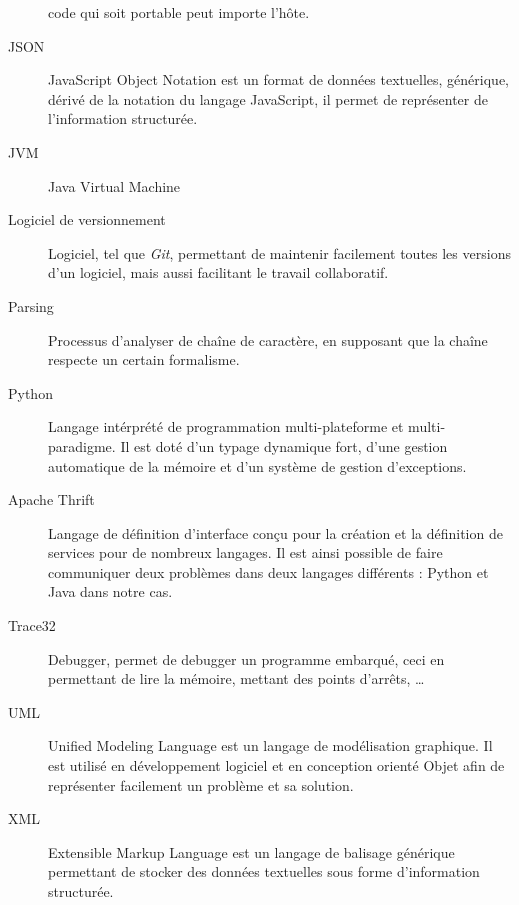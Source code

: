 \begin{description}
	code qui soit portable peut importe l'hôte.
\item[JSON] JavaScript Object Notation est un format de données textuelles, générique, dérivé de la notation du langage JavaScript, il permet de représenter de
	l'information structurée.
\item[JVM] Java Virtual Machine
\item[Logiciel de versionnement] Logiciel, tel que \textit{Git}, permettant de maintenir facilement toutes les versions d'un logiciel, mais aussi facilitant le
	travail collaboratif.
\item[Parsing] Processus d'analyser de chaîne de caractère, en supposant que la chaîne respecte un certain formalisme. 
\item[Python] Langage intérprété de programmation multi-plateforme et multi-paradigme. Il est doté d'un typage dynamique fort, d'une gestion automatique de la mémoire et d'un système de gestion d'exceptions. 
\item[Apache Thrift] Langage de définition d'interface conçu pour la création et la définition de services pour de nombreux langages. Il est ainsi possible de
	faire communiquer deux problèmes dans deux langages différents : Python et Java dans notre cas.
\item[Trace32] Debugger, permet de debugger un programme embarqué, ceci en permettant de lire la mémoire, mettant des points d'arrêts, \ldots
\item[UML] Unified Modeling Language est un langage de modélisation graphique. Il est utilisé en développement logiciel et en conception orienté Objet afin de
	représenter facilement un problème et sa solution.
\item[XML] Extensible Markup Language est un langage de balisage générique permettant de stocker des données textuelles sous forme d'information structurée.
\end{description}

